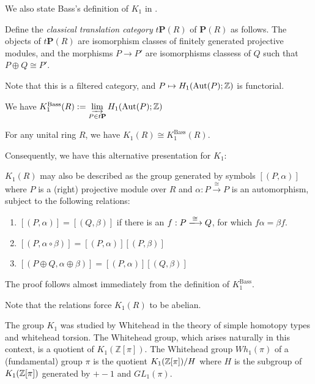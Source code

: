 We also state Bass's definition of $K_1$ in \cite{Bass}.

\begin{definition}
Define the \emph{classical translation category} $t \mathbf P(R)$ of $\mathbf P(R)$ as follows.
The objects of $t\mathbf P(R)$ are isomorphism classes of finitely generated projective modules,
and the morphisms $P \to P'$ are isomorphisms classess of $Q$ such that $P \oplus Q \cong P'$.
\end{definition}

Note that this is a filtered category, and $P \mapsto H_1(\operatorname*{Aut}(P);\mathbb{Z})$ is functorial. 

\begin{definition}
We have $K^{\text{Bass}}_1(R) := \varinjlim\limits_{P \in t \mathbf P} H_1(\operatorname*{Aut}(P);\mathbb{Z})$
\end{definition}

\begin{theorem}
For any unital ring $R$, we have 
   $K_1(R) \cong K^{\text{Bass}}_1(R)$.
\end{theorem}

Consequently, we have this alternative presentation for $K_1$:

\begin{theorem}
$K_1(R)$ may also be described as the group generated by symbols 
$[(P,\alpha)]$ where $P$ is a (right) projective module over $R$ and $\alpha : P \xrightarrow{\cong} P$
is an automorphism, subject to the following relations:
\begin{enumerate}
  \item $[(P,\alpha)] = [(Q,\beta)]$ if there is an $f : P \xlongrightarrow{\cong} Q$, 
  for which 
  $f \alpha = \beta f$.
  \item $[(P,\alpha \circ \beta)] = [(P,\alpha)] [(P,\beta)]$
  \item $[(P \oplus Q, \alpha \oplus \beta)] = [(P,\alpha)] [(Q,\beta)]$
\end{enumerate}
\end{theorem}
The proof follows almost immediately from the definition of $K_1^{\text{Bass}}$.

Note that the relations force $K_1(R)$ to be abelian.


\begin{remark}
The group \(K_1\) was studied by Whitehead in the theory of simple homotopy types and whitehead torsion.
The Whitehead group, which arises naturally in this context, is a quotient of \(K_1(\mathbb Z[\pi])\).
The Whitehead group $Wh_1(\pi)$ of a (fundamental) group $\pi$ is the quotient $K_1(\mathbb{Z}[\pi])/H$ where $H$ is the subgroup
of $K_1(\mathbb{Z}[\pi])$ generated by $+- 1$ and $GL_1(\pi)$.
\end{remark}



